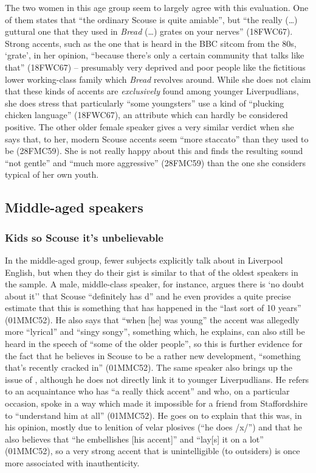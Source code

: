The two women in this age group seem to largely agree with this evaluation.
One of them states that ``the ordinary Scouse is quite amiable'', but ``the really (\ldots) guttural one that they used in \emph{Bread} (\ldots) grates on your nerves'' (18FWC67).
Strong accents, such as the one that is heard in the BBC sitcom from the 80s, `grate', in her opinion, ``because there's only a certain community that talks like that'' (18FWC67) -- presumably very deprived and poor people like the fictitious lower working-class family which \emph{Bread} revolves around.
While she does not claim that these kinds of accents are \emph{exclusively} found among younger Liverpudlians, she does stress that particularly ``some youngsters'' use a kind of ``plucking chicken language'' (18FWC67), an attribute which can hardly be considered positive.
The other older female speaker gives a very similar verdict when she says that, to her, modern Scouse accents seem ``more staccato'' than they used to be (28FMC59).
She is not really happy about this and finds the resulting sound ``not gentle'' and ``much more aggressive'' (28FMC59) than the one she considers typical of her own youth.

\subsection{Middle-aged speakers}
\label{aware_res.eval.mid}
\largerpage
\subsubsection{Kids so Scouse it's unbelievable}
\label{aware_res.eval.mid.change}

In the middle-aged group, fewer subjects explicitly talk about  in Liverpool English, but when they do their gist is similar to that of the oldest speakers in the sample.
A male, middle-class speaker, for instance, argues there is `no doubt about it'' that Scouse ``definitely has d'' and he even provides a quite precise estimate that this is something that has happened in the ``last sort of 10 years'' (01MMC52).
He also says that ``when [he] was young'' the accent was allegedly more ``lyrical'' and ``singy songy'', something which, he explains, can also still be heard in the speech of ``some of the older people'', so this is further evidence for the fact that he believes  in Scouse to be a rather new development, ``something that's recently cracked in'' (01MMC52).
The same speaker also brings up the issue of , although he does not directly link it to younger Liverpudlians.
He refers to an acquaintance who has ``a really thick accent'' and who, on a particular occasion, spoke in a way which made it impossible for a friend from Staffordshire to ``understand him at all'' (01MMC52).
He goes on to explain that this was, in his opinion, mostly due to lenition of velar plosives (``he does /x/'') and that he also believes that ``he embellishes [his accent]'' and ``lay[s] it on a lot'' (01MMC52), so a very strong accent that is unintelligible (to outsiders) is once more associated with inauthenticity.

